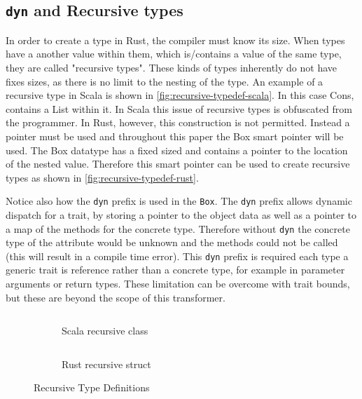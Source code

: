 \documentclass[ oneside,%
                    author={James Elgar},
                    degree={MEng},
                     title={Bidirectional transformer between functional and \\ object-oriented programming in Rust},
                  subtitle={}]{dissertation}
\newcommand{\rust}[1]{\texttt{#1}}
\newcommand{\codefile}[2]{\inputminted[xleftmargin=20pt,linenos, breaklines]{#1}{#2}}
\newcommand{\rustfile}[1]{\codefile{rust}{../#1.rs}}
\newcommand{\rustexample}[1]{\rustfile{examples/src/#1}}
\begin{document}

\subsection{\rust{dyn} and Recursive types}
\label{sec:dyn}

In order to create a type in Rust, the compiler must know its size. When types have a another value within them, which is/contains a value of the same type, they are called "recursive types". These kinds of types inherently do not have fixes sizes, as there is no limit to the nesting of the type. 
An example of a recursive type in Scala is shown in \autoref{fig:recursive-typedef-scala}. In this case Cons, contains a List within it. In Scala this issue of recursive types is obfuscated from the programmer.
In Rust, however, this construction is not permitted. Instead a pointer must be used and throughout this paper the Box smart pointer will be used. The Box datatype has a fixed sized and contains a pointer to the location of the nested value. Therefore this smart pointer can be used to create recursive types as shown in \autoref{fig:recursive-typedef-rust}.

Notice also how the \rust{dyn} prefix is used in the \rust{Box}. The \rust{dyn} prefix allows dynamic dispatch for a trait, by storing a pointer to the object data as well as a pointer to a map of the methods for the concrete type. Therefore without \rust{dyn} the concrete type of the attribute would be unknown and the methods could not be called (this will result in a compile time error). This \rust{dyn} prefix is required each type a generic trait is reference rather than a concrete type, for example in parameter arguments or return types. These limitation can be overcome with trait bounds, but these are beyond the scope of this transformer.

\begin{figure}
\centering
\begin{subfigure}{.5\textwidth}
    \codefile{scala}{../scala/examples/src/main/scala/RecursiveType.scala}
    \caption{Scala recursive class}
    \label{fig:recursive-typedef-scala}
\end{subfigure}%
\begin{subfigure}{.5\textwidth}
    \rustexample{list/oop}
    \caption{Rust recursive struct}
    \label{fig:recursive-typedef-rust}
\end{subfigure}
\caption{Recursive Type Definitions}
\label{fig:recursive-typedef}
\end{figure}
\end{document}
